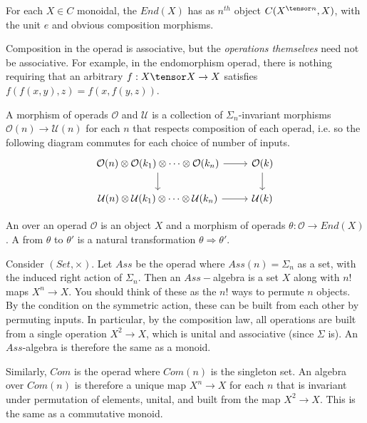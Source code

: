 \begin{example}
    For each $X\in C$ monoidal, the  $End(X)$ has as $n^{th}$ object $C(X^{\tensor n},X)$, with the unit $e$ and obvious composition morphisms.
\end{example}
\begin{remark}
Composition in the operad is associative, but the \textit{operations themselves} need not be associative. For example, in the endomorphism operad, there is nothing requiring that an arbitrary $f:X\tensor X\rightarrow X$ satisfies $f(f(x,y),z)=f(x,f(y,z))$. 
\end{remark}

\begin{definition}
    A morphism of operads $\mathcal{O}$ and $\mathcal{U}$ is a collection of $\Sigma_n$-invariant morphisms $\mathcal{O}(n)\rightarrow \mathcal{U}(n)$ for each $n$ that respects composition of each operad, i.e. so the following diagram commutes for each choice of number of inputs.
\[\begin{tikzcd}
\mathcal{O}(n)\otimes \mathcal{O}(k_1)\otimes\dots\otimes \mathcal{O}(k_n) \arrow[d] \arrow[r] & \mathcal{O}(k) \arrow[d] \\
\mathcal{U}(n)\otimes \mathcal{U}(k_1)\otimes\dots\otimes \mathcal{U}(k_n) \arrow[r]           & \mathcal{U}(k)          
\end{tikzcd}\]
\end{definition}

\begin{definition}
    An  over an operad $\mathcal{O}$ is an object $X$ and a morphism of operads $\theta:\mathcal{O}\rightarrow End(X)$. A  from $\theta$ to $\theta'$ is a natural transformation $\theta\Rightarrow \theta'$.
\end{definition}

\begin{example}
    Consider $(Set,\times)$. Let $Ass$ be the operad where $Ass(n)=\Sigma_n$ as a set, with the induced right action of $\Sigma_n$. Then an $Ass-$algebra is a set $X$ along with $n!$ maps $X^n\rightarrow X$. You should think of these as the $n!$ ways to permute $n$ objects. By the condition on the symmetric action, these can be built from each other by permuting inputs. In particular, by the composition law, all operations are built from a single operation $X^2\rightarrow X$, which is unital and associative (since $\Sigma$ is). An $Ass$-algebra is therefore the same as a monoid.

    Similarly, $Com$ is the operad where $Com(n)$ is the singleton set. An algebra over $Com(n)$ is therefore a unique map $X^n\rightarrow X$ for each $n$ that is invariant under permutation of elements, unital, and built from the map $X^2\rightarrow X$. This is the same as a commutative monoid.
\end{example}

